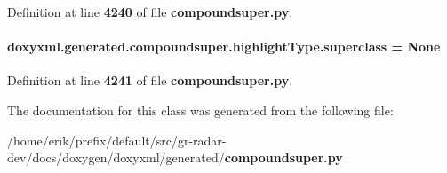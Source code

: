 Definition at line {\bf 4240} of file {\bf compoundsuper.\+py}.

\paragraph[{superclass}]{\setlength{\rightskip}{0pt plus 5cm}doxyxml.\+generated.\+compoundsuper.\+highlight\+Type.\+superclass = None\hspace{0.3cm}{\ttfamily [static]}}\label{classdoxyxml_1_1generated_1_1compoundsuper_1_1highlightType_a220d9dfb290d1467f53941a46b0be0f1}


Definition at line {\bf 4241} of file {\bf compoundsuper.\+py}.



The documentation for this class was generated from the following file\+:\begin{DoxyCompactItemize}
\item 
/home/erik/prefix/default/src/gr-\/radar-\/dev/docs/doxygen/doxyxml/generated/{\bf compoundsuper.\+py}\end{DoxyCompactItemize}
